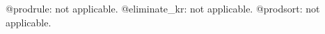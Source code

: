 \documentclass[11pt]{article}
\begin{document}
@prodrule: not applicable.
@eliminate\_kr: not applicable.
@prodsort: not applicable.
\end{document}
